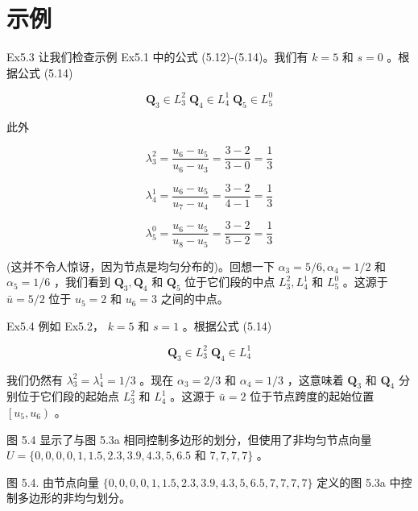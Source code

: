 \documentclass[../main.tex]{subfiles}
\begin{document}
\section*{示例}

Ex5.3 让我们检查示例 Ex5.1 中的公式 (5.12)-(5.14)。我们有 \(k = 5\) 和 \(s = 0\) 。根据公式 (5.14)

\[
{\mathbf{Q}}_{3} \in  {L}_{3}^{2}\;{\mathbf{Q}}_{4} \in  {L}_{4}^{1}\;{\mathbf{Q}}_{5} \in  {L}_{5}^{0}
\]

此外

\[
{\lambda }_{3}^{2} = \frac{{u}_{6} - {u}_{5}}{{u}_{6} - {u}_{3}} = \frac{3 - 2}{3 - 0} = \frac{1}{3}
\]

\[
{\lambda }_{4}^{1} = \frac{{u}_{6} - {u}_{5}}{{u}_{7} - {u}_{4}} = \frac{3 - 2}{4 - 1} = \frac{1}{3}
\]

\[
{\lambda }_{5}^{0} = \frac{{u}_{6} - {u}_{5}}{{u}_{8} - {u}_{5}} = \frac{3 - 2}{5 - 2} = \frac{1}{3}
\]

(这并不令人惊讶，因为节点是均匀分布的)。回想一下 \({\alpha }_{3} = 5/6,{\alpha }_{4} = 1/2\) 和 \({\alpha }_{5} = 1/6\) ，我们看到 \({\mathbf{Q}}_{3},{\mathbf{Q}}_{4}\) 和 \({\mathbf{Q}}_{5}\) 位于它们段的中点 \({L}_{3}^{2},{L}_{4}^{1}\) 和 \({L}_{5}^{0}\) 。这源于 \(\bar{u} = 5/2\) 位于 \({u}_{5} = 2\) 和 \({u}_{6} = 3\) 之间的中点。

Ex5.4 例如 Ex5.2， \(k = 5\) 和 \(s = 1\) 。根据公式 (5.14)

\[
{\mathbf{Q}}_{3} \in  {L}_{3}^{2}\;{\mathbf{Q}}_{4} \in  {L}_{4}^{1}
\]

我们仍然有 \({\lambda }_{3}^{2} = {\lambda }_{4}^{1} = 1/3\) 。现在 \({\alpha }_{3} = 2/3\) 和 \({\alpha }_{4} = 1/3\) ，这意味着 \({\mathbf{Q}}_{3}\) 和 \({\mathbf{Q}}_{4}\) 分别位于它们段的起始点 \({L}_{3}^{2}\) 和 \({L}_{4}^{1}\) 。这源于 \(\bar{u} = 2\) 位于节点跨度的起始位置 \(\left\lbrack  {{u}_{5},{u}_{6}}\right)\) 。

图 5.4 显示了与图 5.3a 相同控制多边形的划分，但使用了非均匀节点向量 \(U = \{ 0,0,0,0,1,{1.5},{2.3},{3.9},{4.3},5,{6.5}\) 和 \(7,7,7,7\}\) 。

\begin{center}
\begin{minipage}{18cm}
\vspace*{.6\baselineskip}
\centering
{}
\par\smallskip
图 5.4. 由节点向量 \(\{ 0,0,0,0,1,{1.5},{2.3},{3.9},{4.3},5,{6.5},7,7,7,7\}\) 定义的图 5.3a 中控制多边形的非均匀划分。
\end{minipage}
\end{center}
\end{document}
